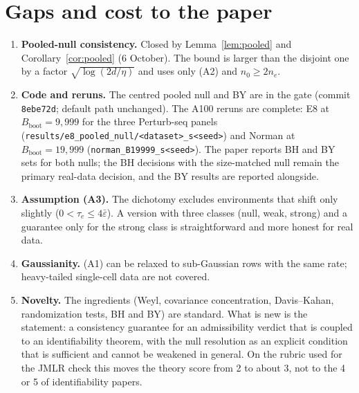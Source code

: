 \documentclass[11pt]{article}
\theoremstyle{remark}
\newcommand{\Bb}{B_{\mathrm{boot}}}
\begin{document}
\section{Gaps and cost to the paper}
\label{sec:gaps}

\begin{enumerate}
  \item \textbf{Pooled-null consistency.} Closed by Lemma~\ref{lem:pooled} and Corollary~\ref{cor:pooled} (6 October). The bound is larger than the disjoint one by a factor $\sqrt{\log(2d/\eta)}$ and uses only (A2) and $n_0\ge2n_e$.
  \item \textbf{Code and reruns.} The centred pooled null and BY are in the gate (commit \texttt{8ebe72d}; default path unchanged). The A100 reruns are complete: E8 at $\Bb=9{,}999$ for the three Perturb-seq panels (\texttt{results/e8\_pooled\_null/<dataset>\_s<seed>}) and Norman at $\Bb=19{,}999$ (\texttt{norman\_B19999\_s<seed>}). The paper reports BH and BY sets for both nulls; the BH decisions with the size-matched null remain the primary real-data decision, and the BY results are reported alongside.
  \item \textbf{Assumption (A3).} The dichotomy excludes environments that shift only slightly ($0<\tau_e\le4\bar\varepsilon$). A version with three classes (null, weak, strong) and a guarantee only for the strong class is straightforward and more honest for real data.
  \item \textbf{Gaussianity.} (A1) can be relaxed to sub-Gaussian rows with the same rate; heavy-tailed single-cell data are not covered.
  \item \textbf{Novelty.} The ingredients (Weyl, covariance concentration, Davis--Kahan, randomization tests, BH and BY) are standard. What is new is the statement: a consistency guarantee for an admissibility verdict that is coupled to an identifiability theorem, with the null resolution as an explicit condition that is sufficient and cannot be weakened in general. On the rubric used for the JMLR check this moves the theory score from 2 to about 3, not to the 4 or 5 of identifiability papers.
\end{enumerate}



\end{document}
